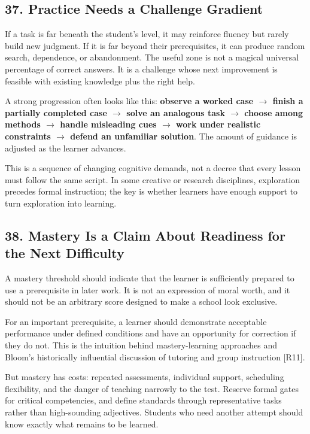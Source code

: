 \subsection*{37. Practice Needs a Challenge Gradient}

If a task is far beneath the student's level, it may reinforce fluency but rarely build new judgment. If it is far beyond their prerequisites, it can produce random search, dependence, or abandonment. The useful zone is not a magical universal percentage of correct answers. It is a challenge whose next improvement is feasible with existing knowledge plus the right help.

A strong progression often looks like this: \textbf{observe a worked case $\to$ finish a partially completed case $\to$ solve an analogous task $\to$ choose among methods $\to$ handle misleading cues $\to$ work under realistic constraints $\to$ defend an unfamiliar solution}. The amount of guidance is adjusted as the learner advances.

This is a sequence of changing cognitive demands, not a decree that every lesson must follow the same script. In some creative or research disciplines, exploration precedes formal instruction; the key is whether learners have enough support to turn exploration into learning.

\subsection*{38. Mastery Is a Claim About Readiness for the Next Difficulty}

A mastery threshold should indicate that the learner is sufficiently prepared to use a prerequisite in later work. It is not an expression of moral worth, and it should not be an arbitrary score designed to make a school look exclusive.

For an important prerequisite, a learner should demonstrate acceptable performance under defined conditions and have an opportunity for correction if they do not. This is the intuition behind mastery-learning approaches and Bloom's historically influential discussion of tutoring and group instruction [R11].

But mastery has costs: repeated assessments, individual support, scheduling flexibility, and the danger of teaching narrowly to the test. Reserve formal gates for critical competencies, and define standards through representative tasks rather than high-sounding adjectives. Students who need another attempt should know exactly what remains to be learned.

